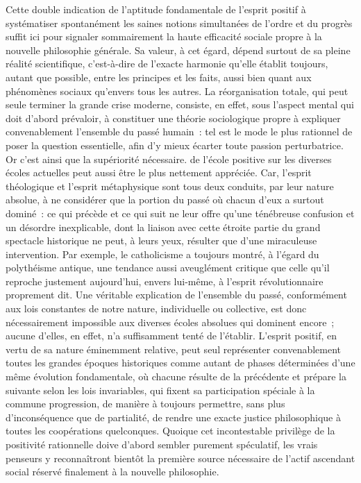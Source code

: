 \documentclass[french,twoside]{book} %
\begin{document}
Cette double indication de l’aptitude fondamentale de l’esprit positif à systématiser spontanément les saines notions simultanées de l’ordre et du progrès suffit ici pour signaler sommairement la haute efficacité sociale propre à la nouvelle philosophie générale. Sa valeur, à cet égard, dépend surtout de sa pleine réalité scientifique, c’est-à-dire de l’exacte harmonie qu’elle établit toujours, autant que possible, entre les principes et les faits, aussi bien quant aux phénomènes sociaux qu’envers tous les autres. La réorganisation totale, qui peut seule terminer la grande crise moderne, consiste, en effet, sous l’aspect mental qui doit d’abord prévaloir, à constituer une théorie sociologique propre à expliquer convenablement l’ensemble du passé humain : tel est le mode le plus rationnel de poser la question essentielle, afin d’y mieux écarter toute passion perturbatrice. Or c’est ainsi que la supériorité nécessaire. de l’école positive sur les diverses écoles actuelles peut aussi être le plus nettement appréciée. Car, l’esprit théologique et l’esprit métaphysique sont tous deux conduits, par leur nature absolue, à ne considérer que la portion du passé où chacun d’eux a surtout dominé : ce qui précède et ce qui suit ne leur offre qu’une ténébreuse confusion et un désordre inexplicable, dont la liaison avec cette étroite partie du grand spectacle historique ne peut, à leurs yeux, résulter que d’une miraculeuse intervention. Par exemple, le catholicisme a toujours montré, à l’égard du polythéisme antique, une tendance aussi aveuglément critique que celle qu’il reproche justement aujourd’hui, envers lui-même, à l’esprit révolutionnaire proprement dit. Une véritable explication de l’ensemble du passé, conformément aux lois constantes de notre nature, individuelle ou collective, est donc nécessairement impossible aux diverses écoles absolues qui dominent encore ; aucune d’elles, en effet, n’a suffisamment tenté de l’établir. L’esprit positif, en vertu de sa nature éminemment relative, peut seul représenter convenablement toutes les grandes époques historiques comme autant de phases déterminées d’une même évolution fondamentale, où chacune résulte de la précédente et prépare la suivante selon les lois invariables, qui fixent sa participation spéciale à la commune progression, de manière à toujours permettre, sans plus d’inconséquence que de partialité, de rendre une exacte justice philosophique à toutes les coopérations quelconques. Quoique cet incontestable privilège de la positivité rationnelle doive d’abord sembler purement spéculatif, les vrais penseurs y reconnaîtront bientôt la première source nécessaire de l’actif ascendant social réservé finalement à la nouvelle philosophie.\par
\end{document}
